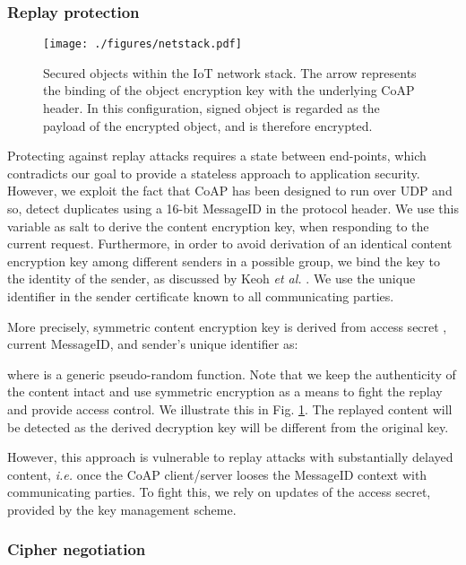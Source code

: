 \documentclass[conference]{IEEEtran}
\begin{document}
\subsubsection{Replay protection} 
\label{replay}

\begin{figure}[htbp]
\centering
\texttt{[image: ./figures/netstack.pdf]}
\caption{Secured objects within the IoT network stack. The arrow represents the binding
of the object encryption key with the underlying CoAP header. In this configuration, 
signed object is regarded as the payload of the encrypted object, and is therefore encrypted.}
\label{fig:netstack}
\end{figure}
Protecting against replay attacks requires a state between end-points, which
contradicts our goal to provide a stateless approach to application
security. However, we exploit the fact that CoAP has been designed to run over
UDP and so, detect duplicates using a 16-bit MessageID in the protocol
header. We use this variable as salt to derive the content encryption key, when
responding to the current request. Furthermore, in order to avoid derivation of an identical
content encryption key among different senders in a possible group, we bind the key to the identity of
the sender, as discussed by Keoh \emph{et al.} \cite{dtls-multicast-draft}. We use
the unique identifier in the sender certificate known to all communicating parties.


More precisely, symmetric content encryption key  is derived from access
secret , current MessageID, and sender's unique identifier as: 



\noindent where  is a generic pseudo-random function. Note that we keep the
authenticity of the content intact and use symmetric encryption as a means to
fight the replay and provide access control. We illustrate this in Fig. \ref{fig:netstack}. 
The replayed content will be detected as the derived decryption key will be different from the original key.




However, this approach is vulnerable to replay attacks with substantially
delayed content, \emph{i.e.} once the CoAP client/server looses the MessageID context with communicating parties. To fight this, we rely on updates of the access secret, provided by the key management scheme.




\subsubsection{Cipher negotiation}
\end{document}
